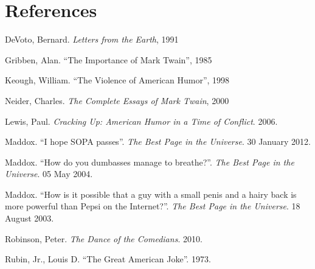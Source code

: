 \section*{References}

\bibent DeVoto, Bernard. \textit{Letters from the Earth}, 1991

\bibent Gribben, Alan. ``The Importance of Mark Twain'', 1985

\bibent Keough, William. ``The Violence of American Humor'', 1998

\bibent Neider, Charles. \textit{The Complete Essays of Mark Twain}, 2000

\bibent Lewis, Paul. \textit{Cracking Up: American Humor in a Time of Conflict}. 2006.

\bibent Maddox. ``I hope SOPA passes''. \textit{The Best Page in the Universe}. 30 January 2012.

\bibent Maddox. ``How do you dumbasses manage to breathe?''. \textit{The Best Page in the Universe}. 05 May 2004.

\bibent Maddox. ``How is it possible that a guy with a small penis and a hairy back is more powerful than Pepsi on the Internet?''. \textit{The Best Page in the Universe}. 18 August 2003.

\bibent Robinson, Peter. \textit{The Dance of the Comedians}. 2010.

\bibent Rubin, Jr., Louis D. ``The Great American Joke''. 1973.
